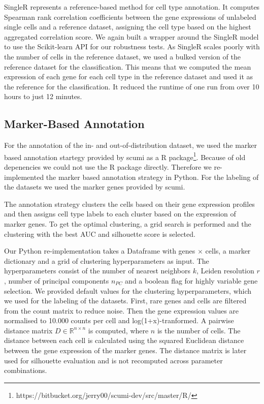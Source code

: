 \documentclass[11pt]{article}
\begin{document}
SingleR \cite{aran_reference-based_2019} represents a reference-based method for cell type annotation. It computes Spearman rank correlation coefficients between the gene expressions of unlabeled single cells and a reference dataset, assigning the cell type based on the highest aggregated correlation score. %
We again built a wrapper around the SingleR model to use the Scikit-learn API for our robustness tests. 
As SingleR scales poorly with the number of cells in the reference dataset, we used a bulked version of the reference dataset for the classification. This means that we computed the mean expression of each gene for each cell type in the reference dataset and used it as the reference for the classification. It reduced the runtime of one run from over 10 hours to just 12 minutes. %


\subsection{Marker-Based Annotation}\label{sec:methods:marker-based-annotation}

For the annotation of the in- and out-of-distribution dataset, we used the marker based annotation startegy provided by scumi \cite{ding_systematic_2020} as a R package\footnote{https://bitbucket.org/jerry00/scumi-dev/src/master/R/}. Because of old depenencies we could not use the R package directly. Therefore we re-implemented the marker based annotation strategy in Python. For the labeling of the datasets we used the marker genes provided by scumi.

The annotation strategy clusters the cells based on their gene expression profiles and then assigns cell type labels to each cluster based on the expression of marker genes. To get the optimal clustering, a grid search is performed and the clustering with the best AUC and silhouette score is selected. %

Our Python re-implementation takes a Dataframe with genes $\times$ cells, a marker dictionary and a grid of clustering hyperparameters as input. The hyperparameters consist of the number of nearest neighbors $k$, Leiden resolution $r$, number of principal components $n_{PC}$ and a boolean flag for highly variable gene selection. We provided default values for the clustering hyperparameters, which we used for the labeling of the datasets.
First, rare genes and cells are filtered from the count matrix to reduce noise. Then the gene expression values are normalised to 10.000 counts per cell and log(1+x)-tranformed. A pairwise distance matrix $D \in \mathbb{R}^{n \times n}$ is computed, where $n$ is the number of cells. The distance between each cell is calculated using the squared Euclidean distance between the gene expression of the marker genes. The distance matrix is later used for silhouette evaluation and is not recomputed across parameter combinations.
\end{document}
